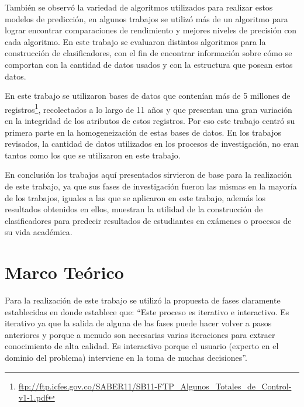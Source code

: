 También se observó la variedad de algoritmos utilizados para realizar estos modelos de predicción, en algunos trabajos se utilizó más de un algoritmo para lograr encontrar comparaciones de rendimiento y mejores niveles de precisión con cada algoritmo. En este trabajo se evaluaron distintos algoritmos para la construcción de clasificadores, con el fin de encontrar información sobre cómo se comportan con la cantidad de datos usados y con la estructura que posean estos datos.

En este trabajo se utilizaron bases de datos que contenían más de 5 millones de registros\footnote{\url{ftp://ftp.icfes.gov.co/SABER11/SB11-FTP_Algunos_Totales_de_Control-v1-1.pdf}}, recolectados a lo largo de 11 años y que presentan una gran variación en la integridad de los atributos de estos registros. Por eso este trabajo centró su primera parte en la homogeneización de estas bases de datos. En los trabajos revisados, la cantidad de datos utilizados en los procesos de investigación, no eran tantos como los que se utilizaron en este trabajo.

En conclusión los trabajos aquí presentados sirvieron de base para la realización de este trabajo, ya que sus fases de investigación fueron las mismas en la mayoría de los trabajos, iguales a las que se aplicaron en este trabajo, además los resultados obtenidos en ellos, muestran la utilidad de la construcción de clasificadores para predecir resultados de estudiantes en exámenes o procesos de su vida académica.
\section{Marco Teórico}
Para la realización de este trabajo se utilizó la propuesta de fases claramente establecidas en \cite{key-50} donde establece que: ``Este proceso es iterativo e interactivo. Es iterativo ya que la salida de alguna de las fases puede hacer volver a pasos anteriores y porque a menudo son necesarias varias iteraciones para extraer conocimiento de alta calidad. Es interactivo porque el usuario (experto en el dominio del problema) interviene en la toma de muchas decisiones''.

